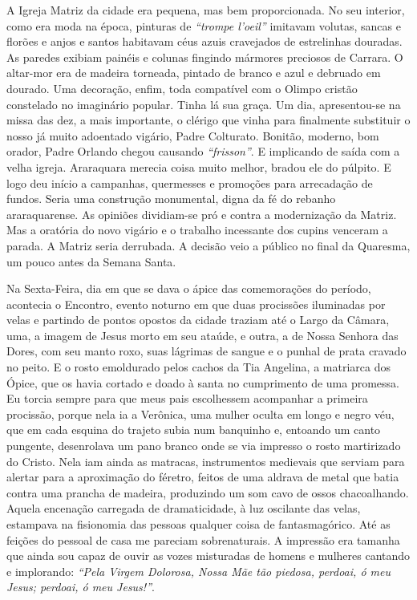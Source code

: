 A Igreja Matriz da cidade era pequena, mas bem proporcionada. 
No seu interior, como era moda na época, pinturas de \textit{``trompe l’oeil''} imitavam volutas, sancas e florões e anjos e santos habitavam céus azuis cravejados de estrelinhas douradas. 
As paredes exibiam painéis e colunas fingindo mármores preciosos de Carrara. 
O altar-mor era de madeira torneada, pintado de branco e azul e debruado em dourado. 
Uma decoração, enfim, toda compatível com o Olimpo cristão constelado no imaginário popular. 
Tinha lá sua graça.
Um dia, apresentou-se na missa das dez, a mais importante, o clérigo que vinha para finalmente substituir o nosso já muito adoentado vigário, Padre Colturato. 
Bonitão, moderno, bom orador, Padre Orlando chegou causando \textit{``frisson''}. 
E implicando de saída com a velha igreja. 
Araraquara merecia coisa muito melhor, bradou ele do púlpito. 
E logo deu início a campanhas, quermesses e promoções para arrecadação de fundos. Seria uma construção monumental, digna da fé do rebanho araraquarense. 
As opiniões dividiam-se pró e contra a modernização da Matriz. Mas a oratória do novo vigário e o trabalho incessante dos cupins venceram a parada. 
A Matriz seria derrubada. 
A decisão veio a público no final da Quaresma, um pouco antes da Semana Santa.

Na Sexta-Feira, dia em que se dava o ápice das comemorações do período, acontecia o Encontro, evento noturno em que duas procissões iluminadas por velas e partindo de pontos opostos da cidade traziam até o Largo da Câmara, uma, a imagem de Jesus morto em seu ataúde, e outra, a de Nossa Senhora das Dores, com seu manto roxo, suas lágrimas de sangue e o punhal de prata cravado no peito. 
E o rosto emoldurado pelos cachos da Tia Angelina, a matriarca dos Ópice, que os havia cortado e doado à santa no cumprimento de uma promessa. 
Eu torcia sempre para que meus pais escolhessem acompanhar a primeira procissão, porque nela ia a Verônica, uma mulher oculta em longo e negro véu, que em cada esquina do trajeto subia num banquinho e, entoando um canto pungente, desenrolava um pano branco onde se via impresso o rosto martirizado do Cristo. 
Nela iam ainda as matracas, instrumentos medievais que serviam para alertar para a aproximação do féretro, feitos de uma aldrava de metal que batia contra uma prancha de madeira, produzindo um som cavo de ossos chacoalhando. Aquela encenação carregada de dramaticidade, à luz oscilante das velas, estampava na fisionomia das pessoas qualquer coisa de fantasmagórico. Até as feições do pessoal de casa me pareciam sobrenaturais. 
A impressão era tamanha que ainda sou capaz de ouvir as vozes misturadas de homens e mulheres cantando e implorando: \textit{``Pela Virgem Dolorosa, Nossa Mãe tão piedosa, perdoai, ó meu Jesus; perdoai, ó meu Jesus!''}.

